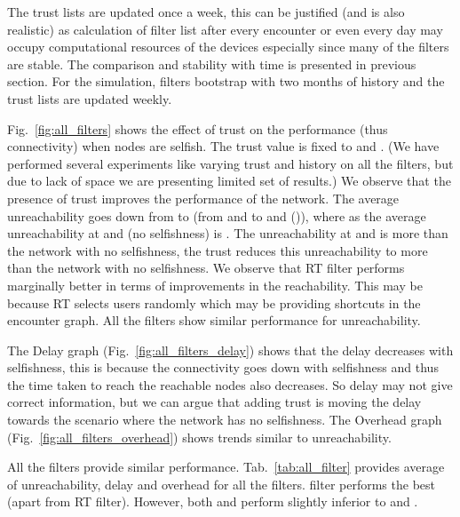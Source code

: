\documentclass[10pt,conference]{IEEEtran}
\begin{document}
 
The trust lists are updated once a week, this can be justified (and is also realistic) as calculation of filter list after every encounter or even every day may occupy computational resources of the devices especially since many of the filters are stable. The comparison and stability with time is presented in previous section. For the simulation, filters bootstrap with two months of history and the trust lists are updated weekly.

 Fig.~\ref{fig:all_filters} shows the effect of trust on the performance (thus connectivity) when nodes are selfish. The trust value is fixed to  and . (We have performed several experiments like varying trust and history on all the filters, but due to lack of space we are presenting limited set of results.) We observe that the  presence of trust improves the performance of the network. The average unreachability goes down from  to  (from  and  to  and  ()), where as the average unreachability at  and  (no selfishness)  is . The unreachability at  and  is  more than the network with no selfishness, the trust reduces this unreachability to  more than the network with no selfishness. We observe that RT filter performs marginally better in terms of improvements in the reachability. This may be because RT selects users randomly which may be providing shortcuts in the encounter graph. All the filters show similar performance for unreachability.

The Delay graph (Fig.~\ref{fig:all_filters_delay}) shows that the delay decreases with selfishness, this is because the connectivity goes down with selfishness and thus the time taken to reach the reachable nodes also decreases. So delay may not give correct information, but we can argue that adding trust is moving the delay towards the scenario where the network has no selfishness. The Overhead graph (Fig.~\ref{fig:all_filters_overhead}) shows trends similar to unreachability.  

All the filters provide similar performance. Tab.~\ref{tab:all_filter} provides average of unreachability, delay and overhead for all the filters.  filter performs the best (apart from RT filter). However, both  and  perform slightly inferior to  and . 
\end{document}
